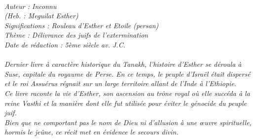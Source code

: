 \BFont
\noindent\hrulefill
{\footnotesize
\textit{
\bigskip
{\centering{}
\\Auteur : Inconnu
\\(Heb. : Meguilat Esther)
\\Significations : Rouleau d’Esther et Etoile (persan)
\\Thème : Délivrance des juifs de l’extermination
\\Date de rédaction : 5ème siècle av. J.C.\\}
}
\textit{
\\Dernier livre à caractère historique du Tanakh, l’histoire d’Esther se déroula à Suse, capitale du royaume de Perse. En ce temps, le peuple d’Israël était dispersé et le roi Assuérus régnait sur un large territoire allant de l’Inde à l'Ethiopie.
\\Ce livre raconte la vie d’Esther, son ascension au trône royal où elle succéda à la reine Vasthi et la manière dont elle fut utilisée pour éviter le génocide du peuple juif.  
\\Bien que ne comportant pas le nom de Dieu ni d’allusion à une œuvre spirituelle, hormis le jeûne, ce récit met en évidence le secours divin.\bigskip
}
}
\par\nobreak\noindent\hrulefill
